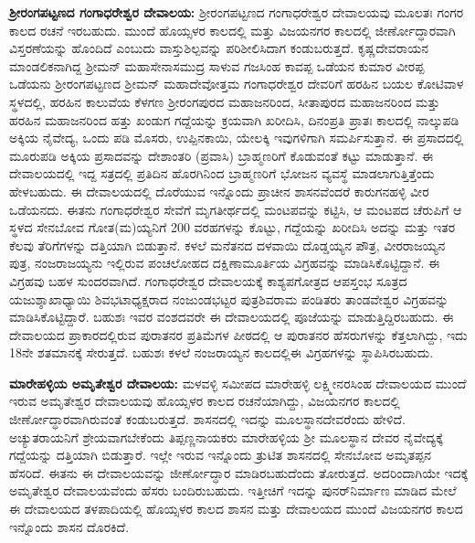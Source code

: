 \textbf{ಶ‍್ರೀರಂಗಪಟ್ಟಣದ ಗಂಗಾಧರೇಶ್ವರ ದೇವಾಲಯ:} ಶ‍್ರೀರಂಗಪಟ್ಟಣದ ಗಂಗಾಧರೇಶ್ವರ ದೇವಾಲಯವು ಮೂಲತಃ ಗಂಗರ ಕಾಲದ ರಚನೆ ಇರಬಹುದು. ಮುಂದೆ ಹೊಯ್ಸಳರ ಕಾಲದಲ್ಲಿ ಮತ್ತು ವಿಜಯನಗರ ಕಾಲದಲ್ಲಿ ಜೀರ್ಣೋದ್ಧಾರವಾಗಿ ವಿಸ್ತರಣೆಯನ್ನು ಹೊಂದಿದೆ ಎಂಬುದು ವಾಸ್ತುಶಿಲ್ಪವನ್ನು ಪರಿಶೀಲಿಸಿದಾಗ ಕಂಡುಬರುತ್ತದೆ. ಕೃಷ್ಣದೇವರಾಯನ ಮಾಂಡಲಿಕ\-ನಾಗಿದ್ದ ಶ‍್ರೀಮನ್​ ಮಹಾಸೇನಾಸಮುದ್ರ ಸಾಳುವ ಗಜಸಿಂಹ ಕಾವಪ್ಪ ಒಡೆಯನ ಕುಮಾರ ವೀರಪ್ಪ ಒಡೆಯನು ಶ‍್ರೀರಂಗಪಟ್ಟಣದ ಶ‍್ರೀಮನ್​ ಮಹಾದೇವೋತ್ತಮ ಗಂಗಾಧರೇಶ್ವರ ದೇವರಿಗೆ ಹರಹಿನ ಬಯಲ ಕೋಟಿವಾಳ ಸ್ಥಳದಲ್ಲಿ, ಹರಹಿನ ಕಾಲುವೆಯ ಕೆಳಗಣ ಶ‍್ರೀರಂಗಪುರದ ಮಹಾಜನರಿಂದ, ಸೀತಾಪುರದ ಮಹಾಜನರಿಂದ ಮತ್ತು ಹರಹಿನ ಮಹಾಜನರಿಂದ ಹತ್ತು ಖಂಡುಗ ಗದ್ದೆಯನ್ನು ಕ್ರಯವಾಗಿ ಖರೀದಿಸಿ, ದಿನಂಪ್ರತಿ ಪ್ರಾತಃ ಕಾಲದಲ್ಲಿ ನಾಲ್ಕುಪಡಿ ಅಕ್ಕಿಯ ನೈವೇದ್ಯ, ಒಂದು ಪಡಿ ಮೊಸರು, ಉಪ್ಪಿನಕಾಯಿ, ಯೇಲಕ್ಕಿ ಇವುಗಳಿಗಾಗಿ ಸಮರ್ಪಿಸುತ್ತಾನೆ. ಈ ಪ್ರಸಾದದಲ್ಲಿ ಮೂರುಪಡಿ ಅಕ್ಕಿಯ ಪ್ರಸಾದವನ್ನು ದೇಶಾಂತರಿ (ಪ್ರವಾಸಿ) ಬ್ರಾಹ್ಮಣರಿಗೆ ಕೊಡುವಂತೆ ಕಟ್ಟು ಮಾಡುತ್ತಾನೆ. ಈ ದೇವಾಲಯದಲ್ಲಿ ಇದ್ದ ಸತ್ರದಲ್ಲಿ ಪ್ರತಿದಿನ ಹೊರಗಿನಿಂದ ಬ್ರಾಹ್ಮಣರಿಗೆ ಭೋಜನ ವ್ಯವಸ್ಥೆ ಮಾಡಲಾಗುತ್ತಿತ್ತೆಂದು ಹೇಳಬಹುದು. ಈ ದೇವಾಲಯದಲ್ಲಿ ದೊರೆಯುವ ಇನ್ನೊಂದು ಪ್ರಾಚೀನ ಶಾಸನವೆಂದರೆ ಕಾರುಗನಹಳ್ಳಿ ವೀರ ಒಡೆಯನದು. ಈತನು ಗಂಗಾಧರೇಶ್ವರ ಸೇವೆಗೆ ಮೃಗತೀರ್ಥದಲ್ಲಿ ಮಂಟಪವನ್ನು ಕಟ್ಟಿಸಿ, ಆ ಮಂಟಪದ ಚೆರುಪಿಗೆ ಆ ಸ್ಥಳದ ಸೇನಬೋವ ಗೋತ(ಮ)ಯ್ಯನಿಗೆ 200 ವರಹಗಳನ್ನು ಕೊಟ್ಟು, ಗದ್ದೆಯನ್ನು ಖರೀದಿಸಿ ಅದನ್ನು ಮತ್ತು ಇತರ ಕೆಲವು ತೆರಿಗೆಗಳನ್ನು ದತ್ತಿಯಾಗಿ ಬಿಡುತ್ತಾನೆ. ಕಳಲೆ ಮನೆತನದ ದಳವಾಯಿ ದೊಡ್ಡಯ್ಯನ ಪೌತ್ರ, ವೀರರಾಜಯ್ಯನ ಪುತ್ರ, ನಂಜರಾಜಯ್ಯನು ಇಲ್ಲಿರುವ ಪಂಚಲೋಹದ ದಕ್ಷಿಣಾಮೂರ್ತಿಯ ವಿಗ್ರಹವನ್ನು ಮಾಡಿಸಿಕೊಟ್ಟಿದ್ದಾನೆ. ಈ ವಿಗ್ರಹವು ಬಹಳ ಸುಂದರವಾಗಿದೆ. ಗಂಗಾಧರೇಶ್ವರ ದೇವಾಲಯಕ್ಕೆ ಕಾಶ್ಯಪಗೋತ್ರದ ಆಪಸ್ತಂಭ ಸೂತ್ರದ ಯಜುಶ್ಶಾಖಾಧ್ಯಾಯಿ ಶಿವಭಟಾಧ್ಯಕ್ಷರಾದ ನಂಜುಂಡಭಟ್ಟರ ಪುತ್ರ\break ಶಿವರಾಮ ಪಂಡಿತರು ತಾಂಡವೇಶ್ವರ ವಿಗ್ರಹವನ್ನು ಮಾಡಿಸಿಕೊಟ್ಟಿದ್ದಾರೆ. ಬಹುಶಃ ಇವರ ವಂಶದವರೇ ಈ ದೇವಾಲಯದಲ್ಲಿ ಪೂಜೆಯನ್ನು ಮಾಡುತ್ತಿದ್ದಿರಬಹುದು. ಈ ದೇವಾಲಯದ ಪ್ರಾಕಾರದಲ್ಲಿರುವ ಪುರಾತನರ ಪ್ರತಿಮೆಗಳ ಪೀಠದಲ್ಲಿ ಆ ಪುರಾತನರ ಹೆಸರುಗಳನ್ನು ಕೆತ್ತಲಾಗಿದ್ದು, ಇದು 18ನೇ ಶತಮಾನಕ್ಕೆ ಸೇರುತ್ತದೆ. ಬಹುಶಃ ಕಳಲೆ ನಂಜರಾಯ್ಯನ ಕಾಲದಲ್ಲಿ\break ಈ ವಿಗ್ರಹಗಳನ್ನು ಸ್ಥಾಪಿಸಿರಬಹುದು.

\textbf{ಮಾರೇಹಳ್ಳಿಯ ಅಮೃತೇಶ್ವರ ದೇವಾಲಯ:} ಮಳವಳ್ಳಿ ಸಮೀಪದ ಮಾರೇಹಳ್ಳಿ ಲಕ್ಷ್ಮೀನರಸಿಂಹ ದೇವಾಲಯದ ಮುಂದೆ ಇರುವ ಅಮೃತೇಶ್ವರ ದೇವಾಲಯವು ಹೊಯ್ಸಳರ ಕಾಲದ ರಚನೆಯಾಗಿದ್ದು, ವಿಜಯನಗರ ಕಾಲದಲ್ಲಿ ಜೀರ್ಣೋದ್ಧಾರ\-ವಾಗಿರುವಂತೆ ಕಂಡುಬರುತ್ತದೆ. ಶಾಸನದಲ್ಲಿ ಇದನ್ನು ಮೂಲಸ್ಥಾನದೇವರೆಂದು ಹೇಳಿದೆ. ಅಚ್ಯುತರಾಯನಿಗೆ ಶ್ರೇಯವಾಗ\-ಬೇಕೆಂದು ತಿಪ್ಪಣ್ಣನಾಯಕರು ಮಾರೇಹಳ್ಳಿಯ ಶ‍್ರೀ ಮೂಲಸ್ಥಾನ ದೇವರ ನೈವೇದ್ಯಕ್ಕೆ ಗದ್ದೆಯನ್ನು ದತ್ತಿಯಾಗಿ ಬಿಡುತ್ತಾರೆ. ಇಲ್ಲೇ ಇರುವ ಇನ್ನೊಂದು ತ್ರುಟಿತ ಶಾಸನದಲ್ಲಿ ಸೇನಬೋವ ಅಮೃತಪ್ಪನ ಹೆಸರಿದೆ. ಈತನು ಈ ದೇವಾಲಯವನ್ನು ಜೀರ್ಣೋದ್ಧಾರ ಮಾಡಿರಬಹುದೆಂದು ತೋರುತ್ತದೆ. ಅದರಿಂದಾಗಿಯೇ ಇದಕ್ಕೆ ಅಮೃತೇಶ್ವರ ದೇವಾಲಯವೆಂದು ಹೆಸರು ಬಂದಿರುಬಹುದು. ಇತ್ತೀಚಿಗೆ ಇದನ್ನು ಪುನರ್​ನಿರ್ಮಾಣ ಮಾಡಿದ ಮೇಲೆ ಈ ದೇವಾಲಯದ ತಳಪಾದಿಯಲ್ಲಿ ಹೊಯ್ಸಳರ ಕಾಲದ ಶಾಸನ ಮತ್ತು ದೇವಾಲಯದ ಮುಂದೆ ವಿಜಯನಗರ ಕಾಲದ ಇನ್ನೊಂದು ಶಾಸನ ದೊರಕಿದೆ.

